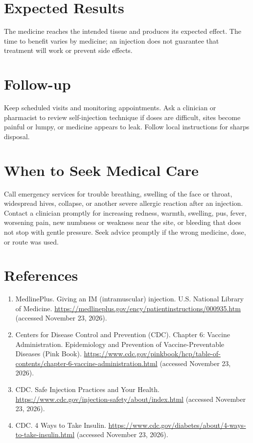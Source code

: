\section*{Expected Results}
The medicine reaches the intended tissue and produces its expected effect. The time to benefit varies by medicine; an injection does not guarantee that treatment will work or prevent side effects.

\section*{Follow-up}
Keep scheduled visits and monitoring appointments. Ask a clinician or pharmacist to review self-injection technique if doses are difficult, sites become painful or lumpy, or medicine appears to leak. Follow local instructions for sharps disposal.

\section*{When to Seek Medical Care}
Call emergency services for trouble breathing, swelling of the face or throat, widespread hives, collapse, or another severe allergic reaction after an injection. Contact a clinician promptly for increasing redness, warmth, swelling, pus, fever, worsening pain, new numbness or weakness near the site, or bleeding that does not stop with gentle pressure. Seek advice promptly if the wrong medicine, dose, or route was used.

\section*{References}
\begin{enumerate}
  \item MedlinePlus. Giving an IM (intramuscular) injection. U.S. National Library of Medicine. \url{https://medlineplus.gov/ency/patientinstructions/000935.htm} (accessed November 23, 2026).
  \item Centers for Disease Control and Prevention (CDC). Chapter 6: Vaccine Administration. Epidemiology and Prevention of Vaccine-Preventable Diseases (Pink Book). \url{https://www.cdc.gov/pinkbook/hcp/table-of-contents/chapter-6-vaccine-administration.html} (accessed November 23, 2026).
  \item CDC. Safe Injection Practices and Your Health. \url{https://www.cdc.gov/injection-safety/about/index.html} (accessed November 23, 2026).
  \item CDC. 4 Ways to Take Insulin. \url{https://www.cdc.gov/diabetes/about/4-ways-to-take-insulin.html} (accessed November 23, 2026).
\end{enumerate}

\clearpage
